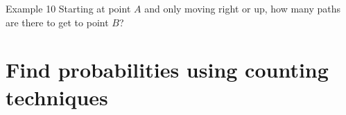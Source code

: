 \documentclass[t]{beamer}
\begin{document}
\begin{frame}{Example 10}
Starting at point $A$ and only moving right or up, how many paths are there to get to point $B$?	
\begin{center}
\begin{tikzpicture}

\end{tikzpicture}
\end{center}
\end{frame}

\section{Find probabilities using counting techniques}
\end{document}
